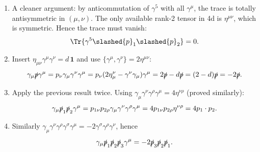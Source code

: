 \begin{solution}
\begin{enumerate}[label=\roman*.]
\begin{equation}
\begin{aligned}
            \implies &\Tr{\slashed{p}_1\slashed{p}_2\slashed{p}_3\slashed{p}_4} = d\left[(p_1\cdot p_2)(p_3\cdot p_4) + (p_1\cdot p_4)(p_2\cdot p_3) - (p_1\cdot p_3)(p_2\cdot p_4)\right].
        \end{aligned}
    \end{equation}
    \item 
    A cleaner argument: by anticommutation of $\gamma^5$ with all $\gamma^\mu$, the trace is totally antisymmetric in $(\mu, \nu)$. The only available rank-2 tensor in 4d is $\eta^{\mu\nu}$, which is symmetric. Hence the trace must vanish:
    \begin{equation}
        \Tr{\gamma^5\slashed{p}_1\slashed{p}_2} = 0.
    \end{equation}
    \item Insert $\eta_{\mu\nu}\gamma^\mu\gamma^\nu = d\,\mathbf{1}$ and use $\{\gamma^\mu, \gamma^\nu\} = 2\eta^{\mu\nu}$:
    \begin{equation}
        \gamma_\mu\slashed{p}\gamma^\mu = p_\nu\gamma_\mu\gamma^\nu\gamma^\mu = p_\nu(2\eta^\nu_\mu - \gamma^\nu\gamma_\mu)\gamma^\mu = 2\slashed{p} - d\slashed{p} = (2-d)\slashed{p} = -2\slashed{p}.
    \end{equation}
    
    \item Apply the previous result twice. Using $\gamma_\mu\gamma^\nu\gamma^\rho\gamma^\mu = 4\eta^{\nu\rho}$ (proved similarly):
    \begin{equation}
        \gamma_\mu\slashed{p}_1\slashed{p}_2\gamma^\mu = p_{1\nu}p_{2\rho}\gamma_\mu\gamma^\nu\gamma^\rho\gamma^\mu = 4 p_{1\nu}p_{2\rho}\eta^{\nu\rho} = 4 p_1\cdot p_2.
    \end{equation}
    
    \item Similarly $\gamma_\mu\gamma^\nu\gamma^\rho\gamma^\sigma\gamma^\mu = -2\gamma^\sigma\gamma^\rho\gamma^\nu$, hence
    \begin{equation}
        \gamma_\mu\slashed{p}_1\slashed{p}_2\slashed{p}_3\gamma^\mu = -2\slashed{p}_3\slashed{p}_2\slashed{p}_1.
    \end{equation}
    

\end{enumerate}
\end{solution}
